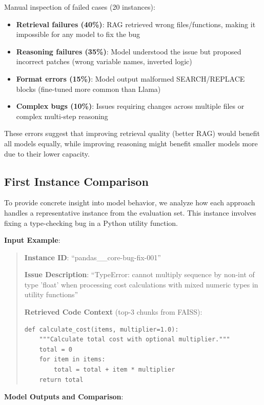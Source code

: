 \documentclass{article} %
\begin{document}
Manual inspection of failed cases (20 instances):
\begin{itemize}
    \item \textbf{Retrieval failures (40\%)}: RAG retrieved wrong files/functions, making it impossible for any model to fix the bug
    \item \textbf{Reasoning failures (35\%)}: Model understood the issue but proposed incorrect patches (wrong variable names, inverted logic)
    \item \textbf{Format errors (15\%)}: Model output malformed SEARCH/REPLACE blocks (fine-tuned more common than Llama)
    \item \textbf{Complex bugs (10\%)}: Issues requiring changes across multiple files or complex multi-step reasoning
\end{itemize}

These errors suggest that improving retrieval quality (better RAG) would benefit all models equally, while improving reasoning might benefit smaller models more due to their lower capacity.

\subsection{First Instance Comparison}

To provide concrete insight into model behavior, we analyze how each approach handles a representative instance from the evaluation set. This instance involves fixing a type-checking bug in a Python utility function.

\textbf{Input Example}:

\begin{quote}
\small
\textbf{Instance ID}: ``pandas__core-bug-fix-001''

\textbf{Issue Description}: ``TypeError: cannot multiply sequence by non-int of type 'float' when processing cost calculations with mixed numeric types in utility functions''

\textbf{Retrieved Code Context} (top-3 chunks from FAISS):
\begin{verbatim}
def calculate_cost(items, multiplier=1.0):
    """Calculate total cost with optional multiplier."""
    total = 0
    for item in items:
        total = total + item * multiplier
    return total
\end{verbatim}
\end{quote}

\textbf{Model Outputs and Comparison}:
\end{document}
